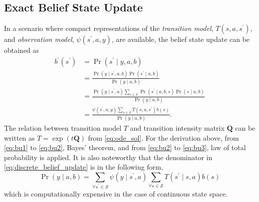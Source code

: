 \subsection{Exact Belief State Update}
\label{sec:exact_update}
In a scenario where compact representations of the \textit{transition model}, $ T(s, a, s^{\prime})$,  and \textit{observation model}, $ \psi(s^{\prime}, a, y) $, are available, the belief state update can be obtained as \cite{KAELBLING199899}
\begin{align}
b^{\prime}\left(s^{\prime}\right) &=\operatorname{Pr}\left(s^{\prime} \mid y, a, b\right) \label{eq:bu1}\\
&=\frac{\operatorname{Pr}\left(y \mid s^{\prime}, a, b\right) \operatorname{Pr}\left(s^{\prime} \mid a, b\right)}{\operatorname{Pr}(y \mid a, b)} \label{eq:bu2}\\
&=\frac{\operatorname{Pr}\left(y \mid s^{\prime}, a\right) \sum_{s \in \mathcal{S}} \operatorname{Pr}\left(s^{\prime} \mid a, b, s\right) \operatorname{Pr}(s \mid a, b)}{\operatorname{Pr}(y \mid a, b)}  \label{eq:bu3}\\
&=\frac{\psi\left(s^{\prime}, a, y\right) \sum_{s \in \mathcal{S}} T\left(s,a, s^{\prime}\right) b(s)}{\operatorname{Pr}(y \mid a, b)}.
\label{eq:discrete_belief_update}
\end{align}
The relation between transition model $ T $ and transition intensity matrix $ \textbf{Q} $ can be written as $ T = \exp(t\textbf{Q}) $ from \autoref{eq:ode_sol}. For the derivation above, from \autoref{eq:bu1} to \autoref{eq:bu2}, Bayes' theorem, and from \autoref{eq:bu2} to \autoref{eq:bu3}, law of total probability is applied. It is also noteworthy that the denominator in \autoref{eq:discrete_belief_update} is in the following form, 
\begin{equation}
\operatorname{Pr}(y \mid a, b) = \sum_{\forall s^{\prime} \in \mathcal{S}} \psi(y \mid s^{\prime}, a) \sum_{\forall s \in \mathcal{S}} T(s^{\prime}\mid s,a) b(s)
\label{eq:nasty_denom}
\end{equation}
which is computationally expensive in the case of continuous state space.
